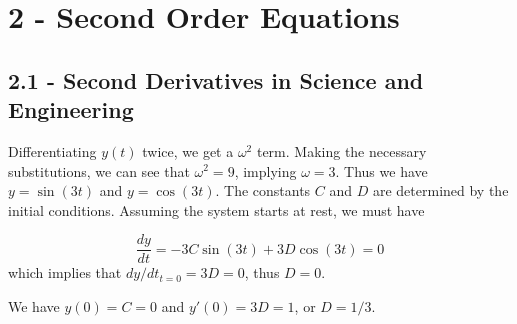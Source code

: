 \documentclass[a4paper]{article}
\begin{document}
\maketitle

\newpage
\tableofcontents

\newpage
\section{\textsf{2 - Second Order Equations}}

\subsection{\textsf{2.1 - Second Derivatives in Science and Engineering}}


Differentiating \(y \!\left( t \right) \) twice, we get a \(\omega^{2}\) term. Making the necessary substitutions, we can see that \(\omega^{2} = 9\), implying \(\omega = 3\). Thus we have \(y = \sin\left( 3t \right)\) and \(y = \cos\left( 3t \right)\). The constants \(C\) and \(D\) are determined by the initial conditions. Assuming the system starts at rest, we must have

\[
	\frac{d y}{d t} = - 3C \sin\left( 3t \right) + 3D \cos\left( 3t \right) = 0
\]
which implies that \(dy / dt_{t = 0} = 3D = 0\), thus \(D = 0\).

\vspace{12pt}


We have \(y \!\left( 0 \right) = C = 0\) and \(y' \!\left( 0 \right) = 3D = 1\), or \(D = 1/3\).

\newpage

\end{document}

